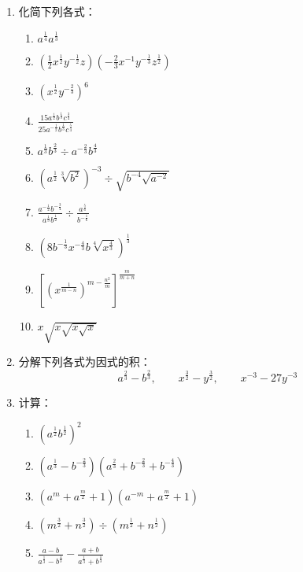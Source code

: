 \begin{enumerate}
\item 化简下列各式：
\begin{multicols}{2}
    \begin{enumerate}
\item $a^{\tfrac{1}{4}}a^{\tfrac{1}{3}}$
\item $\left(\frac{1}{2}x^{\tfrac{1}{2}}y^{-\tfrac{1}{2}}z\right)\left(-\frac{2}{3}x^{-1}y^{-\tfrac{1}{3}}z^{\tfrac{1}{2}}\right)$
\item $\left(x^{\tfrac{1}{2}}y^{-\tfrac{2}{3}}\right)^6$
\item $\frac{15a^{\tfrac{1}{2}}b^{\tfrac{1}{3}}c^{\tfrac{3}{4}}}{25a^{-\tfrac{1}{2}}b^{\tfrac{1}{3}}c^{\tfrac{5}{4}}}$
\item $a^{\tfrac{1}{3}}b^{\tfrac{2}{3}}\div a^{-\tfrac{2}{3}}b^{\tfrac{4}{3}}$
\item $\left(a^{\tfrac{1}{2}}\sqrt[3]{b^2}\right)^{-3}\div \sqrt{b^{-4}\sqrt{a^{-2}}}$
\item $\frac{a^{-\tfrac{1}{2}}b^{-\tfrac{3}{4}}}{a^{\tfrac{1}{3}}b^{\tfrac{1}{2}}}\div \frac{a^{\tfrac{5}{6}}}{b^{-\tfrac{1}{6}}}$
\item $\left(8b^{-\tfrac{1}{3}}x^{-\tfrac{4}{3}}b\sqrt[4]{x^{\tfrac{4}{3}}}\right)^{\tfrac{1}{3}}$
\item $\left[\left(x^{\tfrac{1}{m-n}}\right)^{m-\tfrac{n^2}{m}}\right]^{\tfrac{m}{m+n}}$
\item $x\sqrt{x\sqrt{x\sqrt{x}}}$
    \end{enumerate}
\end{multicols}

\item 分解下列各式为因式的积：
\[a^{\tfrac{2}{3}}-b^{\tfrac{2}{3}},\qquad x^{\tfrac{3}{2}}-y^{\tfrac{3}{2}},\qquad x^{-3}-27y^{-3} \]

\item 计算：
\begin{multicols}{2}
    \begin{enumerate}
\item $\left(a^{\tfrac{1}{2}}b^{\tfrac{1}{2}}\right)^2$
\item $\left(a^{\tfrac{1}{3}}-b^{-\tfrac{2}{3}}\right)\left(a^{\tfrac{2}{3}}+b^{-\tfrac{2}{3}}+b^{-\tfrac{4}{3}}\right)$
\item $\left(a^{m}+a^{\tfrac{m}{2}}+1\right)\left(a^{-m}+a^{\tfrac{m}{2}}+1\right)$
\item $\left(m^{\tfrac{3}{2}}+n^{\tfrac{3}{2}}\right)\div \left(m^{\tfrac{1}{2}}+n^{\tfrac{1}{2}}\right)$
\item $\frac{a-b}{a^{\tfrac{1}{3}}-b^{\tfrac{1}{3}}}-\frac{a+b}{a^{\tfrac{1}{3}}+b^{\tfrac{1}{3}}}$
    \end{enumerate}
\end{multicols}
\end{enumerate}

